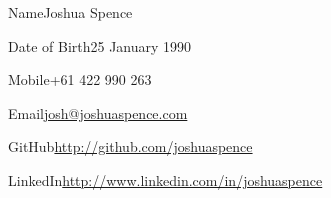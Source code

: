 \begin{personalDetails}
\item{Name}{Joshua Spence}
\item{Date of Birth}{25 January 1990}
\item{Mobile}{+61 422 990 263\vspace{1em}}
\item{Email}{\url{josh@joshuaspence.com}}
\item{GitHub}{\url{http://github.com/joshuaspence}}
\item{LinkedIn}{\url{http://www.linkedin.com/in/joshuaspence}}
\end{personalDetails}
